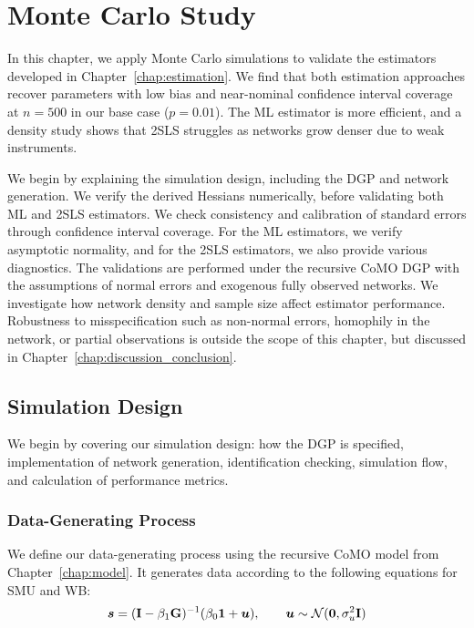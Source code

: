 
\chapter{Monte Carlo Study}
\label{chap:monte_carlo}
In this chapter, we apply Monte Carlo simulations to validate the estimators developed in Chapter~\ref{chap:estimation}. We find that both estimation approaches recover parameters with low bias and near-nominal confidence interval coverage at $n = 500$ in our base case ($p = 0.01$). The ML estimator is more efficient, and a density study shows that 2SLS struggles as networks grow denser due to weak instruments.

We begin by explaining the simulation design, including the DGP and network generation. We verify the derived Hessians numerically, before validating both ML and 2SLS estimators. We check consistency and calibration of standard errors through confidence interval coverage. For the ML estimators, we verify asymptotic normality, and for the 2SLS estimators, we also provide various diagnostics. The validations are performed under the recursive CoMO DGP with the assumptions of normal errors and exogenous fully observed networks. We investigate how network density and sample size affect estimator performance. Robustness to misspecification such as non-normal errors, homophily in the network, or partial observations is outside the scope of this chapter, but discussed in Chapter~\ref{chap:discussion_conclusion}.

\section{Simulation Design}
\label{sec:mc:design}
We begin by covering our simulation design: how the DGP is specified, implementation of network generation, identification checking, simulation flow, and calculation of performance metrics.

\subsection{Data-Generating Process}
\label{sec:mc:dgp}
We define our data-generating process using the recursive CoMO model from Chapter~\ref{chap:model}. It generates data according to the following equations for SMU and WB:
\begin{equation}
    \bm{s} = (\mathbf{I} - \beta_1\mathbf{G})^{-1}(\beta_0\bm{1} + \bm{u}), \qquad \bm{u} \sim \mathcal{N}(\bm{0}, \sigma_u^2\mathbf{I})
\end{equation}

